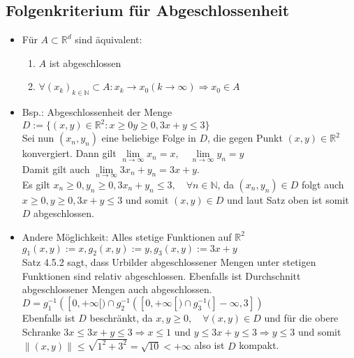 \documentclass[a3paper, 11pt, landscape]{scrartcl}
\begin{document}
\begin{multicols*}{3}
	\subsection{Folgenkriterium für Abgeschlossenheit}
	\begin{itemize}
	    \item Für \(A \subset \mathbb{R}^{d}\) sind äquivalent:
	    \begin{enumerate}
	        \item \(A\) ist abgeschlossen
	        \item \(\forall\left(x_{k}\right)_{k \in \mathbb{N}} \subset A: x_{k} \rightarrow x_{0}(k \rightarrow \infty) \Rightarrow x_{0} \in A\)
	    \end{enumerate}
	    \item Bsp.: Abgeschlossenheit der Menge $D:=\{(x,y)\in\mathbb{R}^2: x\geq 0 y\geq 0, 3x + y \leq 3\}$\\
	    Sei nun $(x_n,y_n)$ eine beliebige Folge in $D$, die gegen Punkt $(x,y)\in\mathbb{R}^2$ konvergiert. Dann gilt $\lim\limits_{n\to\infty}x_n=x,\quad\lim\limits_{n\to\infty}y_n=y$\\
	    Damit gilt auch $\lim\limits_{n\to\infty}3x_n+y_n=3x+y$.\\
	    Es gilt $x_n\geq 0, y_n\geq 0, 3x_n + y_n \leq 3, \quad \forall n \in \mathbb{N}$, da $(x_n,y_n)\in D$ folgt auch $x\geq 0,y\geq 0,3x+y\leq 3$ und somit $(x,y)\in D$ und laut Satz oben ist somit $D$ abgeschlossen.
	    \item Andere Möglichkeit: Alles stetige Funktionen auf $\mathbb{R}^2$ $g_{1}(x, y):=x, g_{2}(x, y):=y, g_{3}(x, y):=3 x+y$\\
	    Satz 4.5.2 sagt, dass Urbilder abgeschlossener Mengen unter stetigen Funktionen sind relativ abgeschlossen. Ebenfalls ist Durchschnitt abgeschlossener Mengen auch abgeschlossen.\\
	    $D=g_{1}^{-1}\left(\left[0,+\infty[) \cap g_{2}^{-1}\left(\left[0,+\infty[) \cap g_{3}^{-1}(]-\infty, 3\right]\right)\right.\right.$\\
	    Ebenfalls ist $D$ beschränkt, da $x,y\geq 0,\quad\forall (x,y)\in D$ und für die obere Schranke $3x\leq 3x+y\leq 3 \Rightarrow x\leq 1$ und $y\leq 3x+y \leq 3 \Rightarrow y\leq 3$ und somit $\|(x, y)\| \leq \sqrt{1^{2}+3^{2}}=\sqrt{10}<+\infty$ also ist $D$ kompakt.
	\end{itemize}
	

\end{multicols*}
\end{document}
